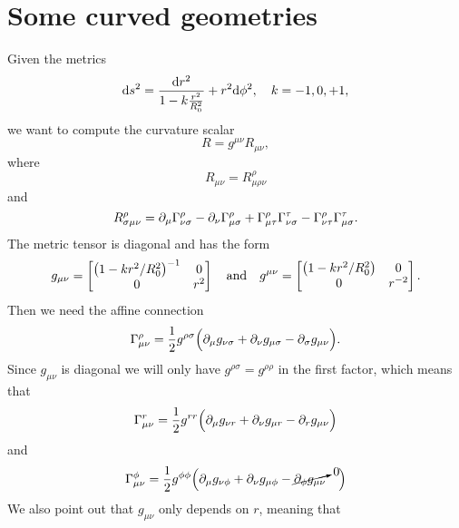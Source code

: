 \documentclass[11pt,a4paper, 
swedish, english %
]{article}
\begin{document}
\section{Some curved geometries}
\swapcommands{\phi}{\varphi}
Given the metrics
\begin{equation}\label{eq8:ds2}
\rd{s}^2=\frac{\rd{r}^2}{1-k\frac{r^2}{R_0^2}}+r^2\rd\phi^2
\qc k=-1,0,+1,
\end{equation}
we want to compute the curvature scalar
\begin{equation}
R=g^{\mu\nu}R_{\mu\nu},
\end{equation}
where
\begin{equation}
R_{\mu\nu}=R^{\rho}_{\mu\rho\nu}
\end{equation}
and
\begin{equation}
R^{\rho}_{\sigma\mu\nu}
=\partial_\mu\Gamma^{\rho}_{\nu\sigma}-\partial_\nu\Gamma^{\rho}_{\mu\sigma}
+\Gamma^\rho_{\mu\tau}\Gamma^\tau_{\nu\sigma}
-\Gamma^\rho_{\nu\tau}\Gamma^\tau_{\mu\sigma}.
\end{equation}
The metric tensor is diagonal and has the form
\begin{equation}\label{eq8:g}
g_{\mu\nu}=
\begin{bmatrix}
\qty(1-kr^2/R_0^2)^{-1}&0\\
0&r^{2}
\end{bmatrix}
\qand
g^{\mu\nu}=
\begin{bmatrix}
\qty(1-kr^2/R_0^2)&0\\
0&r^{-2}
\end{bmatrix}.
\end{equation}
Then we need the affine connection
\begin{equation}
\Gamma^\rho_{\mu\nu}=\frac{1}{2}g^{\rho\sigma}
\Big(
\partial_{\mu}g_{\nu\sigma} +\partial_{\nu}g_{\mu\sigma} -\partial_{\sigma}g_{\mu\nu}
\Big).
\end{equation}
Since $g_{\mu\nu}$ is diagonal we will only have
$g^{\rho\sigma}=g^{\rho\rho}$ in the first factor, which means that
\begin{equation}
\Gamma^r_{\mu\nu}=\frac{1}{2}g^{rr}
\Big(
\partial_{\mu}g_{\nu r} +\partial_{\nu}g_{\mu r} -\partial_{r}g_{\mu\nu}
\Big)
\end{equation}
and
\begin{equation}
\Gamma^\phi_{\mu\nu}=\frac{1}{2}g^{\phi\phi}
\Big(
\partial_{\mu}g_{\nu \phi} +\partial_{\nu}g_{\mu \phi}
-\cancelto{0}{\partial_{\phi}g_{\mu\nu}}\hspace{1em}
\Big)
\end{equation}
We also point out that $g_{\mu\nu}$ only depends on $r$, meaning that
\end{document}
